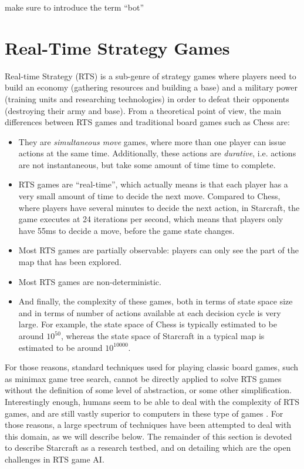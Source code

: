 \documentclass[journal]{IEEEtran}
\begin{document}
{\color{red} make sure to introduce the term ``bot''}

\section{Real-Time Strategy Games}\label{sec:rts}

Real-time Strategy (RTS) is a sub-genre of strategy games where players need to build an economy (gathering resources and building a base) and a military power (training units and researching technologies) in order to defeat their opponents (destroying their army and base). From a theoretical point of view, the main differences between RTS games and traditional board games such as Chess are:

\begin{itemize}
\item They are {\em simultaneous move} games, where more than one player can issue actions at the same time. Additionally, these actions are {\em durative}, i.e. actions are not instantaneous, but take some amount of time time to complete.
\item RTS games are ``real-time'', which actually means is that each player has a very small amount of time to decide the next move. Compared to Chess, where players have several minutes to decide the next action, in Starcraft, the game executes at 24 iterations per second, which means that players only have 55ms to decide a move, before the game state changes.
\item Most RTS games are partially observable: players can only see the part of the map that has been explored.
\item Most RTS games are non-deterministic.
\item And finally, the complexity of these games, both in terms of state space size and in terms of number of actions available at each decision cycle is very large. {\color{red} For example, the state space of Chess is typically estimated to be around $10^{50}$, whereas the state space of Starcraft in a typical map is estimated to be around $10^{10000}$.}
\end{itemize}

For those reasons, standard techniques used for playing classic board games, such as minimax game tree search, cannot be directly applied to solve RTS games without the definition of some level of abstraction, or some other simplification. Interestingly enough, humans seem to be able to deal with the complexity of RTS games, and are still vastly superior to computers in these type of games \cite{burochurchill2012aimagazine}. For those reasons, a large spectrum of techniques have been attempted to deal with this domain, as we will describe below. The remainder of this section is devoted to describe Starcraft as a research testbed, and on detailing which are the open challenges in RTS game AI.
\end{document}
